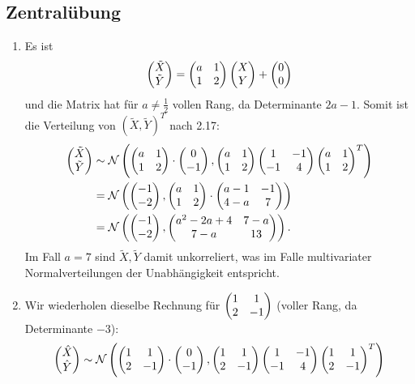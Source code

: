 \documentclass[a4paper]{article}
\begin{document}
\makeexheaderger

\subsection{Zentralübung}

\begin{enumerate}
    \item Es ist 
    \begin{equation*}
        \left(\begin{matrix}\tilde{X} \\ \tilde{Y}\end{matrix}\right) = \left(\begin{matrix}a & 1 \\ 1 & 2\end{matrix}\right) \left(\begin{matrix}X \\ Y\end{matrix}\right) + \left(\begin{matrix}0 \\ 0\end{matrix}\right)
    \end{equation*}
    und die Matrix hat für $a \neq \frac{1}{2}$ vollen Rang, da Determinante $2a - 1$.
    Somit ist die Verteilung von $(\tilde{X}, \tilde{Y})^T$ nach 2.17:
    \begin{align*}
        \left(\begin{matrix}\tilde{X} \\ \tilde{Y}\end{matrix}\right) &\sim \mathcal{N} \left( \left(\begin{matrix}a & 1 \\ 1 & 2\end{matrix}\right) \cdot \left(\begin{matrix}0 \\ -1\end{matrix}\right), \left(\begin{matrix}a & 1 \\ 1 & 2\end{matrix}\right) \left(\begin{matrix}1 & -1 \\ -1 & 4\end{matrix}\right) \left(\begin{matrix}a & 1 \\ 1 & 2\end{matrix}\right)^T  \right)\\
        &= \mathcal{N}\left( \left(\begin{matrix}-1 \\ -2\end{matrix}\right), \left(\begin{matrix}a & 1 \\ 1 & 2\end{matrix}\right) \cdot \left(\begin{matrix}a -1 & -1 \\ 4 - a & 7\end{matrix}\right) \right)\\
        &= \mathcal{N}\left( \left(\begin{matrix}-1 \\ -2\end{matrix}\right), \left(\begin{matrix}a^2 - 2a + 4 & 7-a \\ 7 - a & 13\end{matrix}\right) \right)\text{.}
    \end{align*}
    Im Fall $a = 7$ sind $\tilde{X}, \tilde{Y}$ damit unkorreliert, was im Falle multivariater Normalverteilungen der Unabhängigkeit entspricht.
    \item Wir wiederholen dieselbe Rechnung für $\left(\begin{matrix}1 & 1 \\ 2 & -1\end{matrix}\right)$ (voller Rang, da Determinante $-3$):
    \begin{align*}
        \qmatrix{\hat{X} \\ \hat{Y}} &\sim \mathcal{N} \left( \qmatrix{1 & 1 \\ 2 & -1} \cdot \qmatrix{0 \\ -1}, \qmatrix{1 & 1 \\ 2 & -1} \qmatrix{1 & -1 \\ -1 & 4} \qmatrix{1 & 1 \\ 2 & -1}^T  \right)\\

\end{align*}
\end{enumerate}
\end{document}
